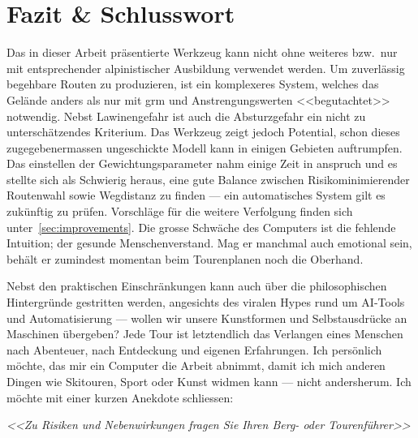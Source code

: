 \section{Fazit \& Schlusswort}

Das in dieser Arbeit präsentierte Werkzeug kann nicht ohne weiteres bzw.\ nur mit entsprechender alpinistischer Ausbildung verwendet werden. Um zuverlässig begehbare Routen zu produzieren, ist ein komplexeres System, welches das Gelände anders als nur mit \gls{grm} und Anstrengungswerten <<begutachtet>> notwendig. Nebst Lawinengefahr ist auch die Absturzgefahr ein nicht zu unterschätzendes Kriterium. Das Werkzeug zeigt jedoch Potential, schon dieses zugegebenermassen ungeschickte Modell kann in einigen Gebieten auftrumpfen. Das einstellen der Gewichtungsparameter nahm einige Zeit in anspruch und es stellte sich als Schwierig heraus, eine gute Balance zwischen Risikominimierender Routenwahl sowie Wegdistanz zu finden --- ein automatisches System gilt es zukünftig zu prüfen. Vorschläge für die weitere Verfolgung finden sich unter\ \ref{sec:improvements}. Die grosse Schwäche des Computers ist die fehlende Intuition; der gesunde Menschenverstand. Mag er manchmal auch emotional sein, behält er zumindest momentan beim Tourenplanen noch die Oberhand. 

Nebst den praktischen Einschränkungen kann auch über die philosophischen Hintergründe gestritten werden, angesichts des viralen Hypes rund um AI-Tools und Automatisierung --- wollen wir unsere Kunstformen und Selbstausdrücke an Maschinen übergeben? Jede Tour ist letztendlich das Verlangen eines Menschen nach Abenteuer, nach Entdeckung und eigenen Erfahrungen. Ich persönlich möchte, das mir ein Computer die Arbeit abnimmt, damit ich mich anderen Dingen wie Skitouren, Sport oder Kunst widmen kann --- nicht andersherum. Ich möchte mit einer kurzen Anekdote schliessen:

\large{
  \textit{<<Zu Risiken und Nebenwirkungen fragen Sie Ihren Berg- oder Tourenführer>>}
}